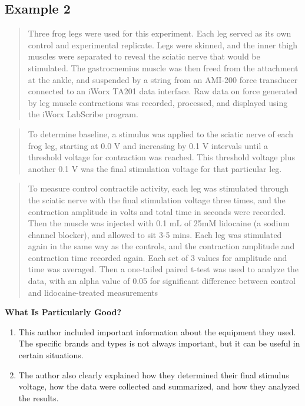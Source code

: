 \documentclass[
]{book}
\providecommand{\tightlist}{%
  \setlength{\itemsep}{0pt}\setlength{\parskip}{0pt}}
\begin{document}
\hypertarget{example-2-5}{%
\subsection{Example 2}\label{example-2-5}}

\begin{quote}
Three frog legs were used for this experiment. Each leg served as its own control and experimental replicate. Legs were skinned, and the inner thigh muscles were separated to reveal the sciatic nerve that would be stimulated. The gastrocnemius muscle was then freed from the attachment at the ankle, and suspended by a string from an AMI-200 force transducer connected to an iWorx TA201 data interface. Raw data on force generated by leg muscle contractions was recorded, processed, and displayed using the iWorx LabScribe program.
\end{quote}

\begin{quote}
To determine baseline, a stimulus was applied to the sciatic nerve of each frog leg, starting at 0.0 V and increasing by 0.1 V intervals until a threshold voltage for contraction was reached. This threshold voltage plus another 0.1 V was the final stimulation voltage for that particular leg.
\end{quote}

\begin{quote}
To measure control contractile activity, each leg was stimulated through the sciatic nerve with the final stimulation voltage three times, and the contraction amplitude in volts and total time in seconds were recorded. Then the muscle was injected with 0.1 mL of 25mM lidocaine (a sodium channel blocker), and allowed to sit 3-5 mins. Each leg was stimulated again in the same way as the controls, and the contraction amplitude and contraction time recorded again. Each set of 3 values for amplitude and time was averaged. Then a one-tailed paired t-test was used to analyze the data, with an alpha value of 0.05 for significant difference between control and lidocaine-treated measurements
\end{quote}

\textbf{What Is Particularly Good?}

\begin{enumerate}
\def\labelenumi{\arabic{enumi}.}
\tightlist
\item
  This author included important information about the equipment they used. The specific brands and types is not always important, but it can be useful in certain situations.
\item
  The author also clearly explained how they determined their final stimulus voltage, how the data were collected and summarized, and how they analyzed the results.
\end{enumerate}
\end{document}
